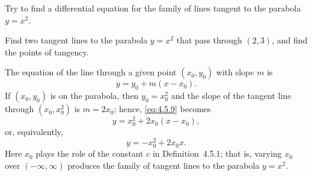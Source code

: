 \setcounter{example}{5}
\begin{example}
  \label{example:4.5.6} \rm \mbox{}
  \begin{alist}
    \item %
    Try to find a differential equation for the family of lines tangent to the parabola $y=x^{2}$.

    \item %
    Find two tangent lines to the parabola $y=x^{2}$ that pass through $(2,3)$, and find the points
    of tangency.
  \end{alist}
\end{example}
\setcounter{equation}{8}
\setcounter{figure}{3}
\begin{examplesolution}
 The equation of the line through a given point $(x_{0},y_{0})$ with slope $m$ is
\begin{equation}
  \label{eq:4.5.9}y=y_{0}+m(x-x_{0}).
\end{equation}
If $(x_{0},y_{0})$ is on the parabola, then $y_{0}=x_{0}^{2}$ and the slope of the tangent line
through $(x_{0},x_{0}^{2})$ is $m=2x_{0}$; hence, \eqref{eq:4.5.9} becomes
\[
  y=x_{0}^{2}+2x_{0}(x-x_{0}),
\]
or, equivalently,
\begin{equation}
  \label{eq:4.5.10}y=-x_{0}^{2}+2x_{0}x.
\end{equation}
Here $x_{0}$ plays the role of the constant $c$ in Definition~4.5.1; that is, varying
$x_{0}$ over $(-\infty,\infty)$ produces the family of tangent lines to the parabola $y=x^{2}$.


\end{examplesolution}
